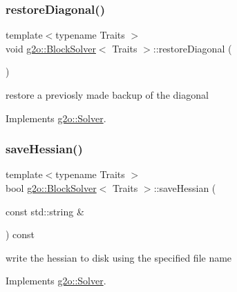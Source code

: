 \subsubsection{\texorpdfstring{restore\+Diagonal()}{restoreDiagonal()}}
{\footnotesize\ttfamily template$<$typename Traits $>$ \\
void \mbox{\hyperlink{classg2o_1_1_block_solver}{g2o\+::\+Block\+Solver}}$<$ Traits $>$\+::restore\+Diagonal (\begin{DoxyParamCaption}{ }\end{DoxyParamCaption})\hspace{0.3cm}{\ttfamily [virtual]}}

restore a previosly made backup of the diagonal 

Implements \mbox{\hyperlink{classg2o_1_1_solver_a3c40dae9b999c4d18e57b02fd0e0ade2}{g2o\+::\+Solver}}.

\mbox{\label{classg2o_1_1_block_solver_a51563178d31f3eae6ec61993ea069a77}} 
\subsubsection{\texorpdfstring{save\+Hessian()}{saveHessian()}}
{\footnotesize\ttfamily template$<$typename Traits $>$ \\
bool \mbox{\hyperlink{classg2o_1_1_block_solver}{g2o\+::\+Block\+Solver}}$<$ Traits $>$\+::save\+Hessian (\begin{DoxyParamCaption}\item[{const std\+::string \&}]{ }\end{DoxyParamCaption}) const\hspace{0.3cm}{\ttfamily [virtual]}}



write the hessian to disk using the specified file name 



Implements \mbox{\hyperlink{classg2o_1_1_solver_a14852543c4dc3f3e7088efe03aa135eb}{g2o\+::\+Solver}}.

\mbox{\label{classg2o_1_1_block_solver_a382173946f1dd929a625e3708c959883}} 
